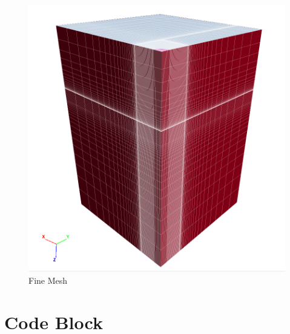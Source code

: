\documentclass[a4paper, nobind]{templates/ociamthesis}
\begin{document}
\begin{figure}[H]
\includegraphics[width=1\linewidth]{myfigureeeeee/fine} \caption{Fine Mesh}\label{fig:unnamed-chunk-7}
\end{figure}

\hypertarget{code-block}{%
\section{Code Block}\label{code-block}}
\end{document}

